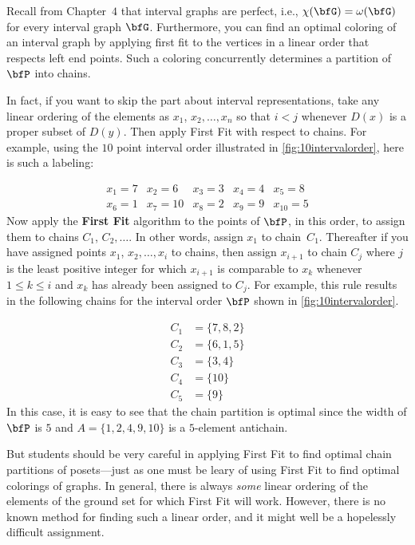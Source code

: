Recall from Chapter~$4$ that interval graphs are perfect, i.e.,
$\chi(\bfG)=\omega(\bfG)$ for every interval graph $\bfG$.  Furthermore,
you can find an optimal coloring of an interval graph by applying first fit
to the vertices in a linear order that respects left end points.
Such a coloring concurrently determines a partition of $\bfP$ into
chains.

In fact, if you want to skip the part about interval representations,
take any linear ordering of the elements as $x_1$, $x_2,\dots,x_n$ so that
$i<j$ whenever $D(x)$ is a proper subset of $D(y)$.  Then apply First
Fit with respect to chains.  For example, using
the $10$ point interval order illustrated in \autoref{fig:10intervalorder},
here is such a labeling: 

\[\begin{array}{ccccc}
x_1 =7 &
x_2 =6 &
x_3 =3 &
x_4 =4 &
x_5 =8\\
x_6 =1 &
x_7 =10 &
x_8 =2 &
x_9 =9 &
x_{10} =5
\end{array}\]
Now apply the \textbf{First Fit} algorithm to the points of $\bfP$,
in this order, to assign them to chains $C_1$, $C_2,\dots$.  In other
words, assign $x_1$ to chain~$C_1$.  Thereafter if you have
assigned points $x_1$, $x_2,\dots,x_i$ to chains, then assign
$x_{i+1}$ to chain $C_j$ where $j$ is the least positive integer
for which $x_{i+1}$ is comparable to $x_k$ whenever $1\le k\le i$ and
$x_k$ has already been assigned to $C_j$.
For example, this rule results in the following chains for the
interval order $\bfP$ shown in \autoref{fig:10intervalorder}.

\begin{align*}
C_1 &= \{7,8,2\}\\ 
C_2 &= \{6,1,5\}\\
C_3 &= \{3,4\}\\
C_4 &= \{10\}\\
C_5 &= \{9\}
\end{align*}
In this case, it is easy to see that the chain partition is
optimal since the width of $\bfP$ is $5$ and $A=\{1,2,4,9,10\}$
is a $5$-element antichain.

But students should be very careful in applying First Fit to find optimal
chain partitions of posets---just as one must be leary of using First Fit
to find optimal colorings of graphs.  In general, there is always \textit{some}
linear ordering of the elements of the ground set for which First Fit will
work.  However, there is no known method for finding such a linear order,
and it might well be a hopelessly difficult assignment.

